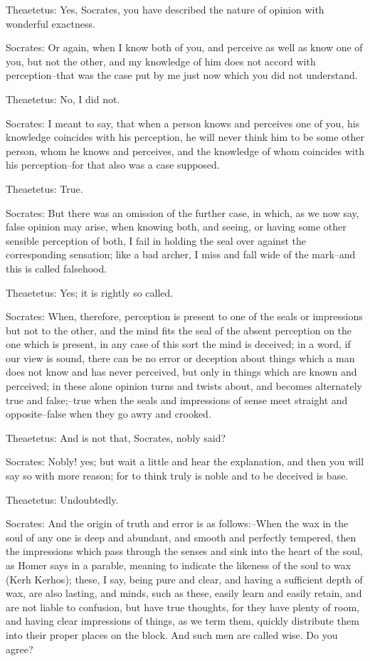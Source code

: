 Theaetetus: Yes, Socrates, you have described the nature of opinion with
wonderful exactness.

Socrates: Or again, when I know both of you, and perceive as well as
know one of you, but not the other, and my knowledge of him does not
accord with perception--that was the case put by me just now which you
did not understand.

Theaetetus: No, I did not.

Socrates: I meant to say, that when a person knows and perceives one of
you, his knowledge coincides with his perception, he will never think
him to be some other person, whom he knows and perceives, and the
knowledge of whom coincides with his perception--for that also was a
case supposed.

Theaetetus: True.

Socrates: But there was an omission of the further case, in which, as
we now say, false opinion may arise, when knowing both, and seeing, or
having some other sensible perception of both, I fail in holding the
seal over against the corresponding sensation; like a bad archer, I miss
and fall wide of the mark--and this is called falsehood.

Theaetetus: Yes; it is rightly so called.

Socrates: When, therefore, perception is present to one of the seals
or impressions but not to the other, and the mind fits the seal of the
absent perception on the one which is present, in any case of this sort
the mind is deceived; in a word, if our view is sound, there can be no
error or deception about things which a man does not know and has never
perceived, but only in things which are known and perceived; in these
alone opinion turns and twists about, and becomes alternately true and
false;--true when the seals and impressions of sense meet straight and
opposite--false when they go awry and crooked.

Theaetetus: And is not that, Socrates, nobly said?

Socrates: Nobly! yes; but wait a little and hear the explanation, and
then you will say so with more reason; for to think truly is noble and
to be deceived is base.

Theaetetus: Undoubtedly.

Socrates: And the origin of truth and error is as follows:--When the wax
in the soul of any one is deep and abundant, and smooth and perfectly
tempered, then the impressions which pass through the senses and sink
into the heart of the soul, as Homer says in a parable, meaning to
indicate the likeness of the soul to wax (Kerh Kerhos); these, I say,
being pure and clear, and having a sufficient depth of wax, are also
lasting, and minds, such as these, easily learn and easily retain,
and are not liable to confusion, but have true thoughts, for they have
plenty of room, and having clear impressions of things, as we term them,
quickly distribute them into their proper places on the block. And such
men are called wise. Do you agree?

